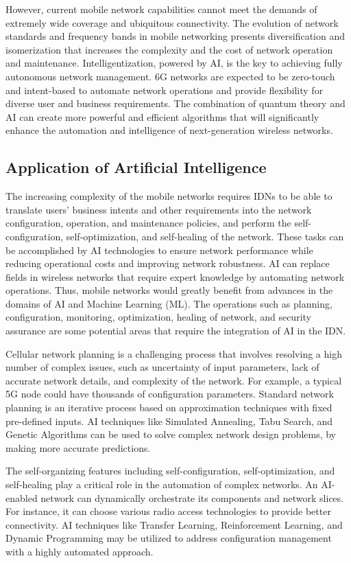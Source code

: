 However, current mobile network capabilities cannot meet the demands of extremely wide coverage and ubiquitous connectivity. The evolution of network standards and frequency bands in mobile networking presents diversification and isomerization that increases the complexity and the cost of network operation and maintenance. Intelligentization, powered by AI, is the key to achieving fully autonomous network management. 6G networks are expected to be zero-touch and intent-based to automate network operations and provide flexibility for diverse user and business requirements. The combination of quantum theory and AI can create more powerful and efficient algorithms that will significantly enhance the automation and intelligence of next-generation wireless networks.\cite{Zhang2019}


\subsection{Application of Artificial Intelligence}
The increasing complexity of the mobile networks requires IDNs to be able to translate users' business intents and other requirements into the network configuration, operation, and maintenance policies, and perform the self-configuration, self-optimization, and self-healing of the network. These tasks can be accomplished by AI technologies to ensure network performance while reducing operational costs and improving network robustness. AI can replace fields in wireless networks that require expert knowledge by automating network operations. Thus, mobile networks would greatly benefit from advances in the domains of AI and Machine Learning (ML). The operations such as planning, configuration, monitoring, optimization, healing of network, and security assurance are some potential areas that require the integration of AI in the IDN. \cite{Wei2020}

Cellular network planning is a challenging process that involves resolving a high number of complex issues, such as uncertainty of input parameters, lack of accurate network details, and complexity of the network. For example, a typical 5G node could have thousands of configuration parameters. Standard network planning is an iterative process based on approximation techniques with fixed pre-defined inputs. AI techniques like Simulated Annealing, Tabu Search, and Genetic Algorithms can be used to solve complex network design problems, by making more accurate predictions.\cite{anuradha2017empowering}

The self-organizing features including self-configuration, self-optimization, and self-healing play a critical role in the automation of complex networks. An AI-enabled network can dynamically orchestrate its components and network slices. For instance, it can choose various radio access technologies to provide better connectivity. AI techniques like Transfer Learning, Reinforcement Learning, and Dynamic Programming may be utilized to address configuration management with a highly automated approach.\cite{anuradha2017empowering}


